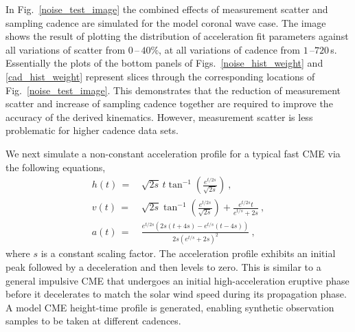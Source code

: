 \documentclass[referee]{aa}
\begin{document}
In Fig.~\ref{noise_test_image} the combined effects of measurement scatter and sampling cadence are simulated for the model coronal wave case. The image shows the result of plotting the distribution of acceleration fit parameters against all variations of scatter from $0$\,--\,$40\%$, at all variations of cadence from $1$\,--$720$\,s. Essentially the plots of the bottom panels of Figs.~\ref{noise_hist_weight} and \ref{cad_hist_weight} represent slices through the corresponding locations of Fig.~\ref{noise_test_image}. This demonstrates that the reduction of measurement scatter and increase of sampling cadence together are required to improve the accuracy of the derived kinematics. However, measurement scatter is less problematic for higher cadence data sets.

We next simulate a non-constant acceleration profile for a typical fast CME via the following equations,
\begin{eqnarray}
h(t)\,=&\,\sqrt{2s}\,t\tan^{-1}\left(\frac{e^{t/2s}}{\sqrt{2s}}\right) \ , \\
v(t)\,=&\,\sqrt{2s}\tan^{-1}\left(\frac{e^{t/2s}}{\sqrt{2s}}\right)+\frac{e^{t/2s}t}{e^{t/s}+2s} \ , \\
a(t)\,=&\,\frac{e^{t/2s}\left(2s\left(t+4s\right)-e^{t/s}\left(t-4s\right)\right)}{2s\left(e^{t/s}+2s\right)^2}\ ,
\label{eqn:nonconst_a}
\end{eqnarray}
where $s$ is a constant scaling factor. The acceleration profile exhibits an initial peak followed by a deceleration and then levels to zero. This is similar to a general impulsive CME that undergoes an initial high-acceleration eruptive phase before it decelerates to match the solar wind speed during its propagation phase. A model CME height-time profile is generated, enabling synthetic observation samples to be taken at different cadences. 
\end{document}
